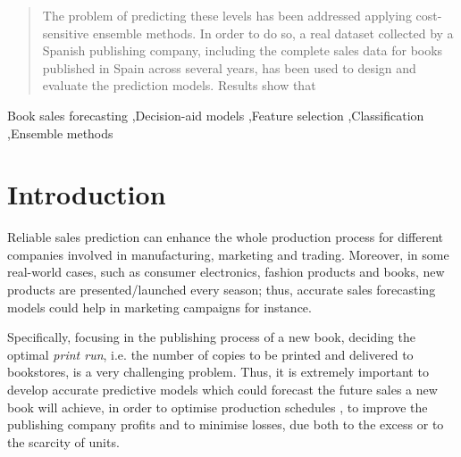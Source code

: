\documentclass[a4paper,10pt,onecolumn,preprint,3p]{elsarticle}
\begin{document}
\begin{frontmatter}
\begin{abstract}
The problem of predicting these levels has been addressed applying cost-sensitive ensemble methods.
In order to do so, a real dataset collected by a Spanish publishing company, including the complete sales data for books published in Spain across several years, has been used to design and evaluate the prediction models.
Results show that %

\end{abstract}


\begin{keyword}
Book sales forecasting \sep Decision-aid models \sep Feature selection \sep Classification \sep Ensemble methods
\end{keyword}

\end{frontmatter}



\section{Introduction}
\label{sec:intro}


Reliable sales prediction can enhance the whole production process for different 
companies involved in manufacturing, marketing and trading.
Moreover, in some real-world cases, such as consumer electronics, fashion products and books, new products are presented/launched every season; thus, accurate sales forecasting models could help in marketing campaigns for instance.

Specifically, focusing in the publishing process of a new book, deciding the optimal {\em  print run}, i.e. the number of copies to be printed and delivered to bookstores, is a very challenging problem. Thus, it is extremely
important to develop accurate predictive models which could forecast
the future sales a new book will achieve, in order to optimise
production schedules \cite{Fildes2010,Saeed2008,Zhao2001}, to improve the publishing company profits and to minimise losses, due both to the excess or to the scarcity of units. 
\end{document}
